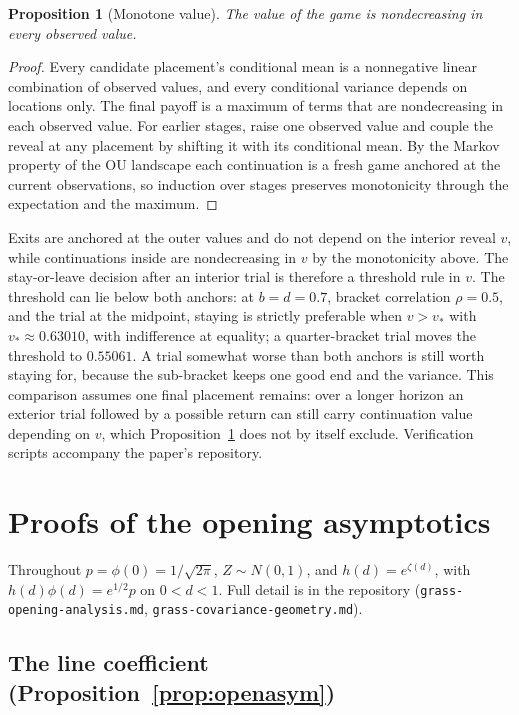 \documentclass[11pt]{article}
\theoremstyle{itheads}
\newtheorem{proposition}{Proposition}
\begin{document}
\begin{proposition}[Monotone value]\label{prop:monotone}
The value of the game is nondecreasing in every observed value.
\end{proposition}

\begin{proof}
Every candidate placement's conditional mean is a nonnegative linear
combination of observed values, and every conditional variance
depends on locations only. The final payoff is a maximum of terms
that are nondecreasing in each observed value. For earlier stages,
raise one observed value and couple the reveal at any placement by
shifting it with its conditional mean. By the Markov property of the
OU landscape each continuation is a fresh game anchored at the
current observations, so induction over stages preserves monotonicity
through the expectation and the maximum.
\end{proof}

Exits are anchored at the outer values and do not depend on the
interior reveal $v$, while continuations inside are nondecreasing in
$v$ by the monotonicity above. The stay-or-leave decision after an
interior trial is therefore a threshold rule in $v$. The threshold
can lie below both anchors: at $b = d = 0.7$, bracket correlation
$\rho = 0.5$, and the trial at the midpoint, staying is strictly
preferable when $v > v_{*}$ with $v_{*}\approx 0.63010$, with
indifference at equality; a quarter-bracket trial moves the threshold
to $0.55061$. A trial somewhat worse than both anchors is still worth
staying for, because the sub-bracket keeps one good end and the
variance. This comparison assumes one final placement remains: over a
longer horizon an exterior trial followed by a possible return can
still carry continuation value depending on $v$, which
Proposition~\ref{prop:monotone} does not by itself exclude.
Verification scripts accompany the paper's repository.

\section{Proofs of the opening asymptotics}\label{app:opening}

Throughout $p=\phi(0)=1/\sqrt{2\pi}$, $Z\sim N(0,1)$, and
$h(d)=e^{\zeta(d)}$, with $h(d)\phi(d)=e^{1/2}p$ on $0<d<1$. Full detail
is in the repository (\texttt{grass-opening-analysis.md},
\texttt{grass-covariance-geometry.md}).

\subsection*{The line coefficient (Proposition~\ref{prop:openasym})}
\end{document}
